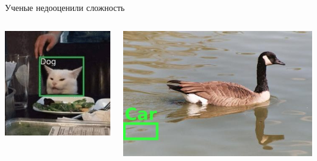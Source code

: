 \documentclass[aspectratio=169, professionalfonts]{beamer}
\begin{document}
\begin{frame}{Ученые недооценили сложность}
    \begin{columns}
        \begin{column}{.33\linewidth}
            \includegraphics[width=\linewidth]{figures/fig12-error-1.jpg}
        \end{column}
        \begin{column}{.33\linewidth}
            \includegraphics[width=\linewidth]{figures/fig13-error-2.jpg}
        \end{column}

\end{columns}
\end{frame}
\end{document}
